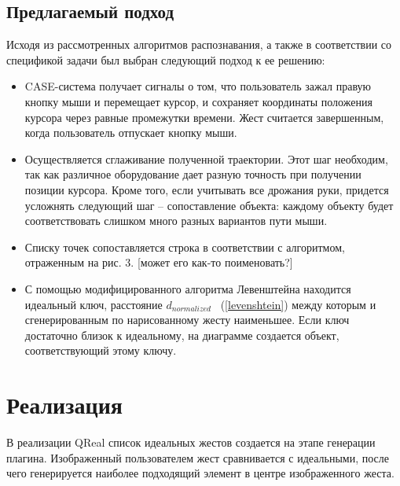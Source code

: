 \documentclass[a5paper]{article}
\begin{document}
\subsection{Предлагаемый подход}

Исходя из рассмотренных алгоритмов распознавания, а также в соответствии со спецификой задачи был выбран следующий подход к ее решению:

\begin{itemize}
  \item CASE-система получает сигналы о том, что пользователь зажал правую кнопку мыши и перемещает курсор, и сохраняет координаты положения курсора
через равные промежутки времени. Жест считается завершенным, когда пользователь отпускает кнопку мыши.
  \item Осуществляется сглаживание полученной траектории. Этот шаг необходим, так как различное оборудование дает разную точность при получении 
позиции курсора. Кроме того, если учитывать все дрожания руки, придется усложнять следующий шаг -- сопоставление объекта: каждому объекту
будет соответствовать слишком много разных вариантов пути мыши.
  \item Списку точек сопоставляется строка в соответствии с алгоритмом, отраженным на рис. 3. [может его как-то поименовать?]
  \item С помощью модифицированного алгоритма Левенштейна находится идеальный ключ, расстояние $d_{normalized}$ ~(\ref{levenshtein}) между которым и 
сгенерированным по нарисованному жесту наименьшее. Если ключ достаточно близок к идеальному, на диаграмме создается объект, соответствующий этому ключу.
\end{itemize}


\section{Реализация}

В реализации QReal список идеальных жестов создается на этапе генерации плагина. Изображенный пользователем жест сравнивается с идеальными, после чего генерируется наиболее подходящий элемент в центре изображенного жеста. 
\end{document}

